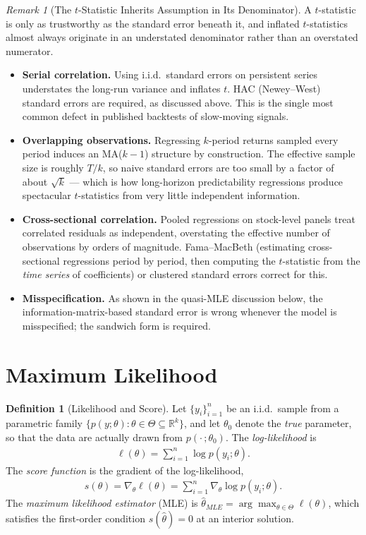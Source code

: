 \documentclass[11pt]{article}
\theoremstyle{definition}
\newtheorem{definition}{Definition}[section]
\theoremstyle{plain}
\theoremstyle{remark}
\newtheorem{remark}{Remark}[section]
\begin{document}
\begin{remark}[The $t$-Statistic Inherits Assumption in Its Denominator]
    A $t$-statistic is only as trustworthy as the standard error beneath it, and inflated $t$-statistics almost always originate in an understated denominator rather than an overstated numerator.
    \begin{itemize}[noitemsep]
        \item \textbf{Serial correlation.} Using i.i.d.\ standard errors on persistent series understates the long-run variance and inflates $t$. HAC (Newey--West) standard errors are required, as discussed above. This is the single most common defect in published backtests of slow-moving signals.
        \item \textbf{Overlapping observations.} Regressing $k$-period returns sampled every period induces an MA($k-1$) structure by construction. The effective sample size is roughly $T/k$, so naive standard errors are too small by a factor of about $\sqrt{k}$ --- which is how long-horizon predictability regressions produce spectacular $t$-statistics from very little independent information.
        \item \textbf{Cross-sectional correlation.} Pooled regressions on stock-level panels treat correlated residuals as independent, overstating the effective number of observations by orders of magnitude. Fama--MacBeth (estimating cross-sectional regressions period by period, then computing the $t$-statistic from the \emph{time series} of coefficients) or clustered standard errors correct for this.
        \item \textbf{Misspecification.} As shown in the quasi-MLE discussion below, the information-matrix-based standard error is wrong whenever the model is misspecified; the sandwich form is required.
    \end{itemize}
\end{remark}

\section{Maximum Likelihood}

\begin{definition}[Likelihood and Score]
    Let $\{y_i\}_{i=1}^n$ be an i.i.d.\ sample from a parametric family $\{p(y;\theta) : \theta \in \Theta \subseteq \mathbb{R}^k\}$, and let $\theta_0$ denote the \emph{true} parameter, so that the data are actually drawn from $p(\cdot\,;\theta_0)$. The \emph{log-likelihood} is
    \begin{align}
        \ell(\theta) = \sum_{i=1}^n \log p(y_i;\theta).
    \end{align}
    The \emph{score function} is the gradient of the log-likelihood,
    \begin{align}
        s(\theta) = \nabla_\theta \ell(\theta) = \sum_{i=1}^n \nabla_\theta \log p(y_i;\theta).
    \end{align}
    The \emph{maximum likelihood estimator} (MLE) is $\hat{\theta}_{MLE} = \arg\max_{\theta \in \Theta} \ell(\theta)$, which satisfies the first-order condition $s(\hat{\theta}) = 0$ at an interior solution.
\end{definition}
\end{document}
